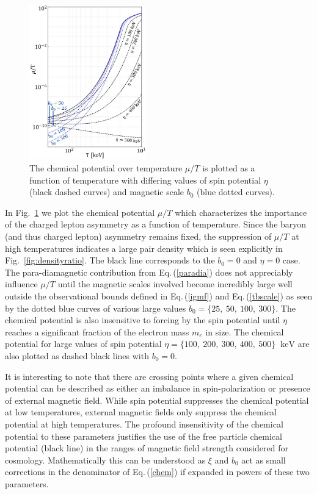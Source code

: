 \documentclass[reprint]{revtex4-2}
\newcommand*{\keV}{\text{ keV}}
\newcommand{\req}[1]{Eq.\,(\ref{#1})}
\newcommand{\rf}[1]{Fig.~{\ref{#1}}}
\begin{document}
\begin{figure}[ht]
    \centering
    \includegraphics[width=0.45\textwidth]{plots/ChemicalPotential_04.jpg}
    \caption{The chemical potential over temperature $\mu/T$ is plotted as a function of temperature with differing values of spin potential $\eta$ (black dashed curves) and magnetic scale $b_{0}$ (blue dotted curves).}
    \label{fig:chemicalpotential}
\end{figure}

In \rf{fig:chemicalpotential} we plot the chemical potential $\mu/T$ which characterizes the importance of the charged lepton asymmetry as a function of temperature. Since the baryon (and thus charged lepton) asymmetry remains fixed, the suppression of $\mu/T$ at high temperatures indicates a large pair density which is seen explicitly in \rf{fig:densityratio}. The black line corresponds to the $b_{0}=0$ and $\eta=0$ case. The para-diamagnetic contribution from \req{paradia} does not appreciably influence $\mu/T$ until the magnetic scales involved become incredibly large well outside the observational bounds defined in \req{igmf} and \req{tbscale} as seen by the dotted blue curves of various large values $b_{0}=\{25,\ 50,\ 100,\ 300\}$. The chemical potential is also insensitive to forcing by the spin potential until $\eta$ reaches a significant fraction of the electron mass $m_{e}$ in size. The chemical potential for large values of spin potential $\eta=\{100,\ 200,\ 300,\ 400,\ 500\}\ \keV$ are also plotted as dashed black lines with $b_{0}=0$.

It is interesting to note that there are crossing points where a given chemical potential can be described as either an imbalance in spin-polarization or presence of external magnetic field. While spin potential suppresses the chemical potential at low temperatures, external magnetic fields only suppress the chemical potential at high temperatures. The profound insensitivity of the chemical potential to these parameters justifies the use of the free particle chemical potential (black line) in the ranges of magnetic field strength considered for cosmology. Mathematically this can be understood as $\xi$ and $b_{0}$ act as small corrections in the denominator of \req{chem} if expanded in powers of these two parameters.
\end{document}

